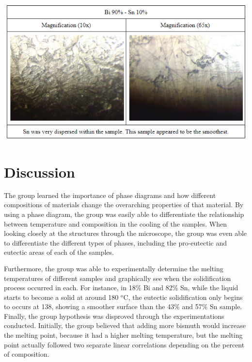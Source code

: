 \documentclass{article}
\begin{document}
\begin{center}
\includegraphics[width=400pt]{Microscope90Bi10Sn.png}
\end{center}

\section{Discussion}
The group learned the importance of phase diagrams and how different compositions of materials change the overarching properties of that material. By using a phase diagram, the group was easily able to differentiate the relationship between temperature and composition in the cooling of the samples. When looking closely at the structures through the microscope, the group was even able to differentiate the different types of phases, including the pro-eutectic and eutectic areas of each of the samples. 

Furthermore, the group was able to experimentally determine the melting temperatures of different samples and graphically see when the solidification process occurred in each. For instance, in 18\% Bi and 82\% Sn, while the liquid starts to become a solid at around 180 $^o$C, the eutectic solidification only begins to occurs at 138, showing a smoother surface than the 43\% and 57\% Sn sample. Finally, the group hypothesis was disproved through the experimentations conducted. Initially, the group believed that adding more bismuth would increase the melting point, because it had a higher melting temperature, but the melting point actually followed two separate linear correlations depending on the percent of composition. 
\end{document}

